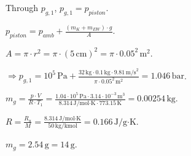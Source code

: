 Through \( p_{g,1} \), \( p_{g,1} = p_{piston} \).  

\( p_{piston} = p_{amb} + \frac{(m_K + m_{EW}) \cdot g}{A} \).  

\( A = \pi \cdot r^2 = \pi \cdot (5 \, \text{cm})^2 = \pi \cdot 0.05^2 \, \text{m}^2 \).  

\(\Rightarrow p_{g,1} = 10^5 \, \text{Pa} + \frac{32 \, \text{kg} \cdot 0.1 \, \text{kg} \cdot 9.81 \, \text{m/s}^2}{\pi \cdot 0.05^2 \, \text{m}^2} = 1.046 \, \text{bar}\).  

\( m_g = \frac{p \cdot V}{R \cdot T_1} = \frac{1.04 \cdot 10^5 \, \text{Pa} \cdot 3.14 \cdot 10^{-3} \, \text{m}^3}{8.314 \, \text{J/mol·K} \cdot 773.15 \, \text{K}} = 0.00254 \, \text{kg} \).  

\( R = \frac{R_u}{M} = \frac{8.314 \, \text{J/mol·K}}{50 \, \text{kg/kmol}} = 0.166 \, \text{J/g·K} \).  

\( m_g = 2.54 \, \text{g} = 14 \, \text{g} \).